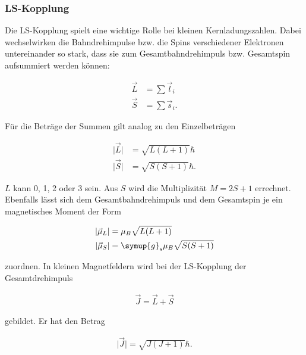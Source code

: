             \subsubsection{LS-Kopplung}

                Die LS-Kopplung spielt eine wichtige Rolle bei kleinen Kernladungszahlen. 
                Dabei wechselwirken die Bahndrehimpulse bzw. die Spins verschiedener Elektronen 
                untereinander so stark, dass sie zum Gesamtbahndrehimpuls bzw. Gesamtspin 
                aufsummiert werden können: 

                \begin{align*}
                    \vec{L} &= \sum \vec{l}_i\\
                    \vec{S} &= \sum \vec{s}_i.
                \end{align*}


                Für die Beträge der Summen gilt analog zu den Einzelbeträgen

                \begin{align*}
                    \lvert\vec{L}\rvert &= \sqrt{L(L+1)}\hbar\\ 
                    \lvert\vec{S}\rvert &= \sqrt{S(S+1)}\hbar.
                \end{align*}

                $L$ kann 0, 1, 2 oder 3 sein. Aus $S$ wird die Multiplizität $M=2S+1$ errechnet.
                Ebenfalls lässt sich dem Gesamtbahndrehimpuls und dem Gesamtspin je ein 
                magnetisches Moment der Form

                \begin{align*}
                    \lvert\vec{\mu}_L\rvert &= \mu_B\sqrt{L(L+1)}\\
                    \lvert\vec{\mu}_S\rvert &= \symup{g}_s\mu_B\sqrt{S(S+1)}\\
                \end{align*}

                zuordnen.
                In kleinen Magnetfeldern wird bei der LS-Kopplung der Gesamtdrehimpuls 

                \begin{align*}
                    \vec{J}=\vec{L}+\vec{S}
                \end{align*}

                gebildet. Er hat den Betrag 

                \begin{align*}
                    \lvert \vec{J}\rvert = \sqrt{J(J+1)}\hbar.
                \end{align*}                

